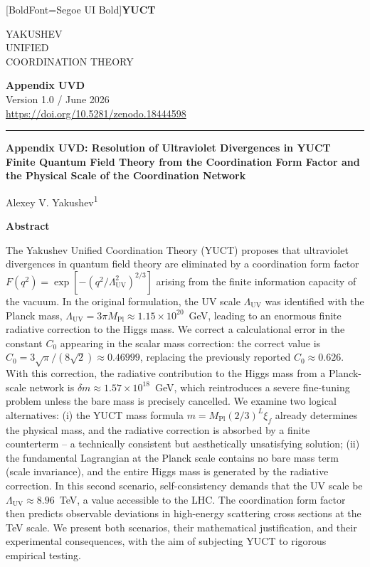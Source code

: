 \documentclass[12pt,a4paper]{article}
\newcommand{\Mpl}{M_{\mathrm{Pl}}}
\newcommand{\LUV}{\Lambda_{\mathrm{UV}}}
\theoremstyle{remark}
\newcommand{\makeheader}{%
	\noindent
	\begin{minipage}{0.17\textwidth}
		\raggedright
		{\fontspec{Segoe UI}[BoldFont=Segoe UI Bold]\bfseries\color{skyblue}\fontsize{46}{46}\selectfont YUCT}%
	\end{minipage}%
	\hspace{30pt}
	\begin{minipage}{0.32\textwidth}
		\raggedright
		{\sffamily\fontsize{11}{13}\selectfont YAKUSHEV\\ UNIFIED\\ COORDINATION THEORY}%
	\end{minipage}%
	\hfill
	\begin{minipage}{0.38\textwidth}
		\raggedleft
		{\sffamily\bfseries Appendix UVD}\\ 
		{\sffamily Version 1.0 / June 2026}\\ 
		{\sffamily\footnotesize \url{https://doi.org/10.5281/zenodo.18444598}}%
	\end{minipage}
	\par\vspace{5pt}
	\noindent\textcolor{gold}{\rule{\textwidth}{1.6pt}}
	\par\vspace{0pt}
}
\begin{document}
	
	\thispagestyle{firstpage}
	\makeheader
	
	\vspace{0.5cm}
	{\LARGE\bfseries Appendix UVD: Resolution of Ultraviolet Divergences in YUCT \\
		\Large Finite Quantum Field Theory from the Coordination Form Factor and the Physical Scale of the Coordination Network \par}
	\vspace{0.3cm}
	
	{\large Alexey V. Yakushev\textsuperscript{1}} \\
	\vspace{0.2cm}
	
	{\color{darkblue}\textbf{\LARGE Abstract}} \par
	{\large
		\noindent
		The Yakushev Unified Coordination Theory (YUCT) proposes that ultraviolet divergences in quantum field theory are eliminated by a coordination form factor \\ \(F(q^2) = \exp[-(q^2/\LUV^2)^{2/3}]\) arising from the finite information capacity of the vacuum.  In the original formulation, the UV scale \(\LUV\) was identified with the Planck mass, \(\LUV = 3\pi\Mpl \approx 1.15\times 10^{20}\)~GeV, leading to an enormous finite radiative correction to the Higgs mass.  We correct a calculational error in the constant \(C_0\) appearing in the scalar mass correction: the correct value is \(C_0 = 3\sqrt{\pi}/(8\sqrt{2}) \approx 0.46999\), replacing the previously reported \(C_0 \approx 0.626\).  With this correction, the radiative contribution to the Higgs mass from a Planck-scale network is \(\delta m \approx 1.57\times 10^{18}\)~GeV, which reintroduces a severe fine-tuning problem unless the bare mass is precisely cancelled.  We examine two logical alternatives: (i) the YUCT mass formula \(m = \Mpl(2/3)^L\xi_f\) already determines the physical mass, and the radiative correction is absorbed by a finite counterterm -- a technically consistent but aesthetically unsatisfying solution; (ii) the fundamental Lagrangian at the Planck scale contains no bare mass term (scale invariance), and the entire Higgs mass is generated by the radiative correction.  In this second scenario, self-consistency demands that the UV scale be \(\LUV \approx 8.96\)~TeV, a value accessible to the LHC.  The coordination form factor then predicts observable deviations in high-energy scattering cross sections at the TeV scale.  We present both scenarios, their mathematical justification, and their experimental consequences, with the aim of subjecting YUCT to rigorous empirical testing.
	}
	
\end{document}
